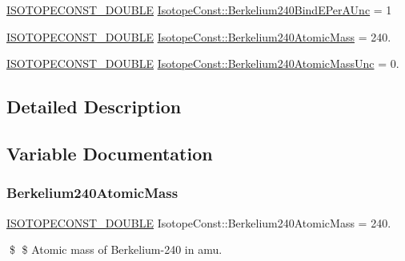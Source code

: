 \begin{DoxyCompactItemize}
\mbox{\hyperlink{group___isotope_const-_macros_ga8f45a7272ce02c0b4c65c44636ed719a}{I\+S\+O\+T\+O\+P\+E\+C\+O\+N\+S\+T\+\_\+\+D\+O\+U\+B\+LE}} \mbox{\hyperlink{group___isotope_const-_berkelium-_bk240_gaf02f3eddd0ff18cbb2d1363da00c83a6}{Isotope\+Const\+::\+Berkelium240\+Bind\+E\+Per\+A\+Unc}} = 1
\item 
\mbox{\hyperlink{group___isotope_const-_macros_ga8f45a7272ce02c0b4c65c44636ed719a}{I\+S\+O\+T\+O\+P\+E\+C\+O\+N\+S\+T\+\_\+\+D\+O\+U\+B\+LE}} \mbox{\hyperlink{group___isotope_const-_berkelium-_bk240_ga9ee9103f081ef152f548d1e8e122d9c0}{Isotope\+Const\+::\+Berkelium240\+Atomic\+Mass}} = 240.
\item 
\mbox{\hyperlink{group___isotope_const-_macros_ga8f45a7272ce02c0b4c65c44636ed719a}{I\+S\+O\+T\+O\+P\+E\+C\+O\+N\+S\+T\+\_\+\+D\+O\+U\+B\+LE}} \mbox{\hyperlink{group___isotope_const-_berkelium-_bk240_gad1e83cd9bb92981330a02a19f8ee0ac5}{Isotope\+Const\+::\+Berkelium240\+Atomic\+Mass\+Unc}} = 0.
\end{DoxyCompactItemize}


\subsection{Detailed Description}


\subsection{Variable Documentation}
\mbox{\label{group___isotope_const-_berkelium-_bk240_ga9ee9103f081ef152f548d1e8e122d9c0}} 
\subsubsection{\texorpdfstring{Berkelium240\+Atomic\+Mass}{Berkelium240AtomicMass}}
{\footnotesize\ttfamily \mbox{\hyperlink{group___isotope_const-_macros_ga8f45a7272ce02c0b4c65c44636ed719a}{I\+S\+O\+T\+O\+P\+E\+C\+O\+N\+S\+T\+\_\+\+D\+O\+U\+B\+LE}} Isotope\+Const\+::\+Berkelium240\+Atomic\+Mass = 240.}

\$ \$ Atomic mass of Berkelium-\/240 in amu. \mbox{\label{group___isotope_const-_berkelium-_bk240_gad1e83cd9bb92981330a02a19f8ee0ac5}} 
